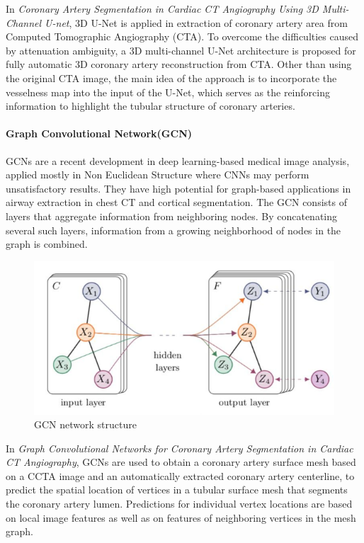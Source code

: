 \documentclass[lang=cn,11pt,a4paper,cite=numbers]{elegantpaper}
\begin{document}
In \emph{Coronary Artery Segmentation in Cardiac CT Angiography Using 3D Multi-Channel U-net}\cite{15}, 3D U-Net is applied in extraction of coronary artery area from Computed Tomographic Angiography (CTA). To overcome the difficulties caused by attenuation ambiguity, a 3D multi-channel U-Net architecture is proposed for fully automatic 3D coronary artery reconstruction from CTA. Other than using the original CTA image, the main idea of the approach is to incorporate the vesselness map into the input of the U-Net, which serves as the reinforcing information to highlight the tubular structure of coronary arteries.

\paragraph{Graph Convolutional Network(GCN)}

GCNs are a recent development in deep learning-based medical image analysis, applied mostly in Non Euclidean Structure where CNNs may perform unsatisfactory results. They have high potential for graph-based applications in airway extraction in chest CT and cortical segmentation. The GCN consists of layers that aggregate information from neighboring nodes. By concatenating several such layers, information from a growing neighborhood of nodes in the graph is combined.

\begin{figure}[H]
    \centering
    \includegraphics[scale=0.8]{./image/文献综述/图形卷积网络.png}
    \caption{GCN network structure}
    \label{fig:GCN}
\end{figure}

In \emph{Graph Convolutional Networks for Coronary Artery Segmentation in Cardiac CT Angiography}\cite{16}, GCNs are used to obtain a coronary artery surface mesh based on a CCTA image and an automatically extracted coronary artery centerline, to predict the spatial location of vertices in a tubular surface mesh that segments the coronary artery lumen. Predictions for individual vertex locations are based on local image features as well as on features of neighboring vertices in the mesh graph.
\end{document}
